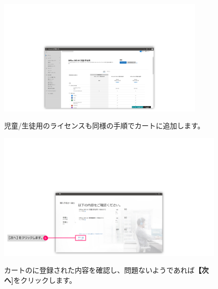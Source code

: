 \begin{figure}[h]
    \begin{minipage}{0.6\textwidth}
        \vspace{-1.4cm}
        \includegraphics[width=10cm]{figures/O365A1_buy02.png}
    \end{minipage}
    \begin{minipage}{0.4\textwidth}
        児童/生徒用のライセンスも同様の手順でカートに追加します。
    \end{minipage}
\end{figure}

\begin{figure}[h]
    \begin{minipage}{0.6\textwidth}
        \vspace{-1.8cm}\hspace{-0.6cm}
        \includegraphics[width=11cm]{figures/O365A1_buy03.png}
    \end{minipage}
    \begin{minipage}{0.4\textwidth}
        カートのに登録された内容を確認し、問題ないようであれば\textbf{【次へ]}をクリックします。
    \end{minipage}
\end{figure}

